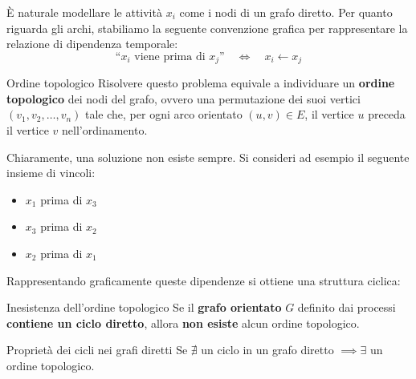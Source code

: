 \documentclass[12pt]{report}
\begin{document}
	È naturale modellare le attività $x_i$ come i nodi di un grafo diretto. Per quanto riguarda gli archi, stabiliamo la seguente convenzione grafica per rappresentare la relazione di dipendenza temporale:
	\[
	\text{``$x_i$ viene prima di $x_j$''} \quad \iff \quad x_i \longleftarrow x_j
	\]
	
	\begin{definizione}{Ordine topologico}{}
		Risolvere questo problema equivale a individuare un \textbf{ordine topologico} dei nodi del grafo, ovvero una permutazione dei suoi vertici $(v_1, v_2, \dots, v_n)$ tale che, per ogni arco orientato $(u, v) \in E$, il vertice $u$ preceda il vertice $v$ nell'ordinamento.
	\end{definizione}
	
	Chiaramente, una soluzione non esiste sempre. Si consideri ad esempio il seguente insieme di vincoli:
	\begin{itemize}
		\item $x_1$ prima di $x_3$
		\item $x_3$ prima di $x_2$
		\item $x_2$ prima di $x_1$
	\end{itemize}
	
	Rappresentando graficamente queste dipendenze si ottiene una struttura ciclica:
	
	\begin{center}
	\end{center}
	
	\begin{proposizione}{Inesistenza dell'ordine topologico}{}
		Se il \textbf{grafo orientato} $G$ definito dai processi \textbf{contiene un ciclo diretto}, allora \textbf{non esiste} alcun ordine topologico.
	\end{proposizione}
	
	\begin{proposizione}{Proprietà dei cicli nei grafi diretti}{}
		Se $\nexists$ un ciclo in un grafo diretto $\implies \exists$ un ordine topologico.
	\end{proposizione}
	
\end{document}
